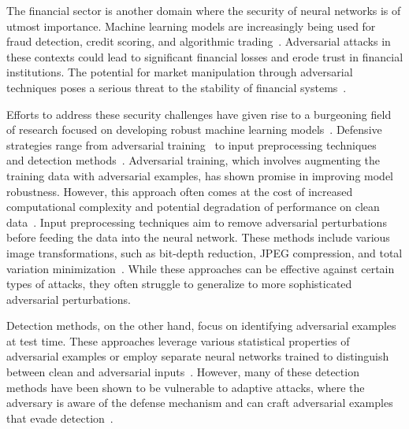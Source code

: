 The financial sector is another domain where the security of neural networks is of utmost importance.
Machine learning models are increasingly being used for fraud detection, credit scoring, and algorithmic trading~\citep{gu2018adversarial}.
Adversarial attacks in these contexts could lead to significant financial losses and erode trust in financial institutions.
The potential for market manipulation through adversarial techniques poses a serious threat to the stability of financial systems~\citep{li2020adversarial}.

Efforts to address these security challenges have given rise to a burgeoning field of research focused on developing robust machine learning models~\citep{madry2017towards}.
Defensive strategies range from adversarial training~\citep{tramer2017ensemble} to input preprocessing techniques~\citep{guo2017countering} and detection methods~\citep{metzen2017detecting}.
Adversarial training, which involves augmenting the training data with adversarial examples, has shown promise in improving model robustness.
However, this approach often comes at the cost of increased computational complexity and potential degradation of performance on clean data~\citep{tsipras2018robustness}.
Input preprocessing techniques aim to remove adversarial perturbations before feeding the data into the neural network.
These methods include various image transformations, such as bit-depth reduction, JPEG compression, and total variation minimization~\citep{xu2017feature}.
While these approaches can be effective against certain types of attacks, they often struggle to generalize to more sophisticated adversarial perturbations.

Detection methods, on the other hand, focus on identifying adversarial examples at test time.
These approaches leverage various statistical properties of adversarial examples or employ separate neural networks trained to distinguish between clean and adversarial inputs~\citep{meng2017magnet}.
However, many of these detection methods have been shown to be vulnerable to adaptive attacks, where the adversary is aware of the defense mechanism and can craft adversarial examples that evade detection~\citep{athalye2018obfuscated}.

